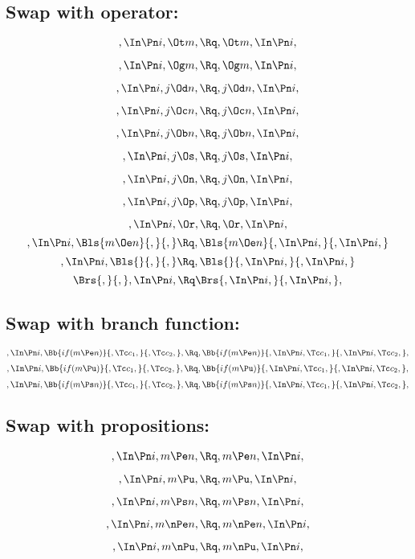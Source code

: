 \bigskip
\bigskip
\subsection{Swap with  operator:}
\[,\In \Pn i, \Ot m, \Rq , \Ot m, \In \Pn i,\]

\[,\In \Pn i, \Og m, \Rq , \Og m, \In \Pn i,\]

\[,\In \Pn i, j \Od n, \Rq , j \Od n, \In \Pn i,\]

\[,\In \Pn i, j \Oc n, \Rq , j \Oc n, \In \Pn i,\]

\[,\In \Pn i, j \Ob n, \Rq , j \Ob n, \In \Pn i,\]

\[,\In \Pn i, j \Os, \Rq , j \Os, \In \Pn i,\]

\[,\In \Pn i, j \On, \Rq , j \On, \In \Pn i,\]

\[,\In \Pn i, j \Op, \Rq , j \Op, \In \Pn i,\]

\[,\In \Pn i, \Or, \Rq , \Or, \In \Pn i,\]
\bigskip
\[,\In \Pn i, \Bls{m \Oe n}{,}{,} \Rq , \Bls{m \Oe n}{,\In \Pn i,}{,\In \Pn i,}\]
\bigskip
\[,\In \Pn i, \Bls{}{,}{,} \Rq , \Bls{}{,\In \Pn i,}{,\In \Pn i,}\]
\bigskip
\[ \Brs{,}{,},\In \Pn i, \Rq \Brs{,\In \Pn i,}{,\In \Pn i,},\]



\bigskip
\bigskip
\subsection{Swap with branch function:}
\[,\In \Pn i, \Bb{if(m \Pe n)}{,\Tc c_1,}{,\Tc c_2,}, \Rq , \Bb{if(m \Pe n)}{,\In \Pn i, \Tc c_1,}{,\In \Pn i, \Tc c_2,},\]
\bigskip
\bigskip
\[,\In \Pn i, \Bb{if(m \Pu)}{,\Tc c_1,}{,\Tc c_2,}, \Rq , \Bb{if(m \Pu)}{,\In \Pn i, \Tc c_1,}{,\In \Pn i, \Tc c_2,},\]
\bigskip
\bigskip
\[,\In \Pn i, \Bb{if(m \Ps n)}{,\Tc c_1,}{,\Tc c_2,}, \Rq , \Bb{if(m \Ps n)}{,\In \Pn i, \Tc c_1,}{,\In \Pn i, \Tc c_2,},\]


\bigskip
\bigskip
\subsection{Swap with propositions:}
\[,\In \Pn i, m \Pe n, \Rq , m \Pe n, \In \Pn i,\]

\[,\In \Pn i, m \Pu, \Rq , m \Pu, \In \Pn i,\]

\[,\In \Pn i, m \Ps n, \Rq , m \Ps n, \In \Pn i,\]

\[,\In \Pn i, m \nPe n, \Rq , m \nPe n, \In \Pn i,\]

\[,\In \Pn i, m \nPu, \Rq , m \nPu, \In \Pn i,\]

